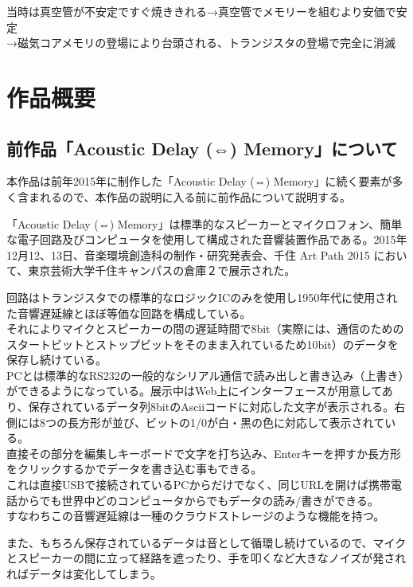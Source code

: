 当時は真空管が不安定ですぐ焼ききれる→真空管でメモリーを組むより安価で安定\\
→磁気コアメモリの登場により台頭される、トランジスタの登場で完全に消滅

\chapter{作品概要}\label{ux4f5cux54c1ux6982ux8981}

\section{前作品「Acoustic Delay (⇔)
Memory」について}\label{ux524dux4f5cux54c1acoustic-delay-memoryux306bux3064ux3044ux3066}

本作品は前年2015年に制作した「Acoustic Delay (⇔)
Memory」に続く要素が多く含まれるので、本作品の説明に入る前に前作品について説明する。

「Acoustic Delay (⇔)
Memory」は標準的なスピーカーとマイクロフォン、簡単な電子回路及びコンピュータを使用して構成された音響装置作品である。2015年12月12、13日、音楽環境創造科の制作・研究発表会、千住
Art Path 2015 において、東京芸術大学千住キャンパスの倉庫２で展示された。

回路はトランジスタでの標準的なロジックICのみを使用し1950年代に使用された音響遅延線とほぼ等価な回路を構成している。\\
それによりマイクとスピーカーの間の遅延時間で8bit（実際には、通信のためのスタートビットとストップビットをそのまま入れているため10bit）のデータを保存し続けている。\\
PCとは標準的なRS232の一般的なシリアル通信で読み出しと書き込み（上書き）ができるようになっている。展示中はWeb上にインターフェースが用意してあり、保存されているデータ列8bitのAsciiコードに対応した文字が表示される。右側には8つの長方形が並び、ビットの1/0が白・黒の色に対応して表示されている。\\
直接その部分を編集しキーボードで文字を打ち込み、Enterキーを押すか長方形をクリックするかでデータを書き込む事もできる。\\
これは直接USBで接続されているPCからだけでなく、同じURLを開けば携帯電話からでも世界中どのコンピュータからでもデータの読み/書きができる。\\
すなわちこの音響遅延線は一種のクラウドストレージのような機能を持つ。

また、もちろん保存されているデータは音として循環し続けているので、マイクとスピーカーの間に立って経路を遮ったり、手を叩くなど大きなノイズが発されればデータは変化してしまう。

